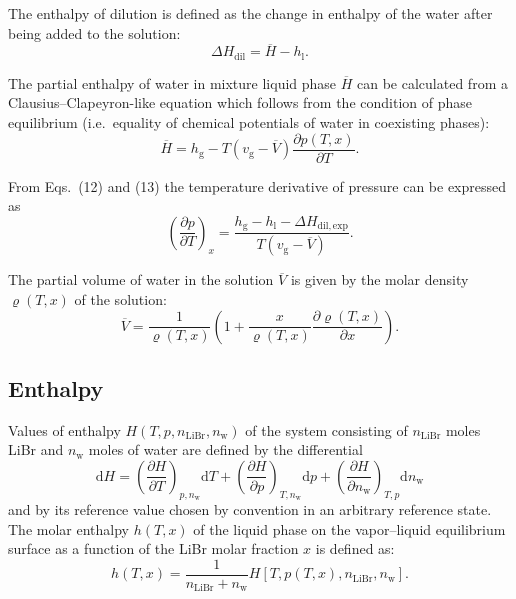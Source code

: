 \documentclass[11pt]{article}
\newcommand{\dens}{\varrho}
\newcommand{\Hbar}{\overline{H}}
\newcommand{\Vbar}{\overline{V}}
\begin{document}

\noindent The enthalpy of dilution is defined as the change in
enthalpy of the water after being added to the solution:
\begin{equation}
\Delta H_\mathrm{dil} = \Hbar - h_\mathrm{l}.
\end{equation}

\noindent The partial enthalpy of water in mixture liquid phase
$\Hbar$ can be calculated from a Clausius--Clapeyron-like equation
which follows from the condition of phase equilibrium (i.e.\ equality
of chemical potentials of water in coexisting phases):
\begin{equation}
\Hbar = h_\mathrm{g} - T(v_\mathrm{g}-\Vbar)
        \frac{\partial p(T,x)}{\partial T}.
\end{equation}

\noindent From Eqs.~(12) and (13) the temperature derivative of
pressure can be expressed as
\begin{equation}
\left(\frac{\partial p}{\partial T}\right)_{\!x}
 = \frac{h_\mathrm{g}-h_\mathrm{l}-\Delta H_\mathrm{dil,exp}}
        {T(v_\mathrm{g}-\Vbar)}.
\end{equation}


\noindent The partial volume of water in the solution $\Vbar$ is
given by the molar density $\dens(T,x)$ of the solution:
\begin{equation}
\Vbar = \frac{1}{\dens(T,x)}
  \left( 1 + \frac{x}{\dens(T,x)}
  \frac{\partial \dens(T,x)}{\partial x} \right).
\end{equation}

\subsection{Enthalpy}

Values of enthalpy $H(T,p,n_\mathrm{LiBr},n_\mathrm{w})$ of the system
consisting of $n_\mathrm{LiBr}$ moles LiBr and $n_\mathrm{w}$ moles of
water are defined by the differential
\begin{equation}
\mathrm{d}H
 = \left(\frac{\partial H}{\partial T}\right)_{\!p,n_\mathrm{w}}\!\mathrm{d}T
 + \left(\frac{\partial H}{\partial p}\right)_{\!T,n_\mathrm{w}}\!\mathrm{d}p
 + \left(\frac{\partial H}{\partial n_\mathrm{w}}\right)_{\!T,p}\!\mathrm{d}n_\mathrm{w}
\end{equation}
and by its reference value chosen by convention in an arbitrary
reference state. The molar enthalpy $h(T,x)$ of the liquid phase on
the vapor--liquid equilibrium surface as a function of the LiBr molar
fraction $x$ is defined as:
\begin{equation}
h(T,x) = \frac{1}{n_\mathrm{LiBr}+n_\mathrm{w}}
         H\!\left[T,p(T,x),n_\mathrm{LiBr},n_\mathrm{w}\right].
\end{equation}
\end{document}
